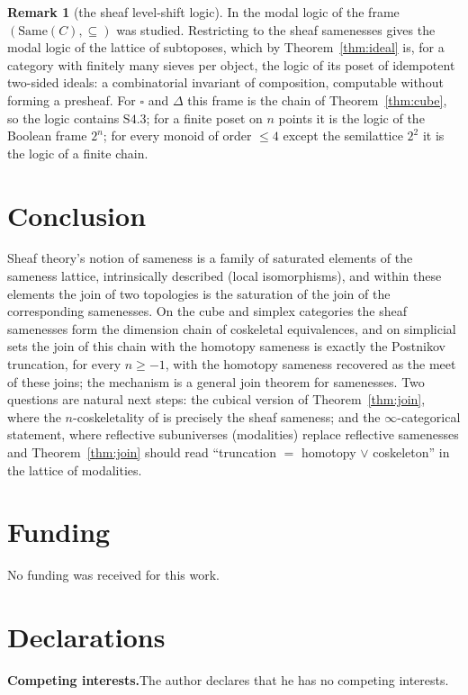 \documentclass[11pt]{amsart}
\theoremstyle{definition}
\newtheorem{rem}[thm]{Remark}
\newcommand{\Same}{\mathrm{Same}}
\newcommand{\cube}{\square}
\begin{document}
\begin{rem}[the sheaf level-shift logic]
In \cite{SameB} the modal logic of the frame $(\Same(C),\subseteq)$ was
studied. Restricting to the sheaf samenesses gives the modal logic of the lattice
of subtoposes, which by Theorem~\ref{thm:ideal} is, for a category with
finitely many sieves per object, the logic of its poset of idempotent
two-sided ideals: a combinatorial invariant of composition, computable without
forming a presheaf. For $\cube$ and $\Delta$ this frame is the chain of
Theorem~\ref{thm:cube}, so the logic contains $\mathrm{S4.3}$; for a finite
poset on $n$ points it is the logic of the Boolean frame $2^n$; for every
monoid of order $\le4$ except the semilattice $2^2$ it is the logic of a
finite chain.
\end{rem}

\section{Conclusion}
Sheaf theory's notion of sameness is a family of saturated elements of the
sameness lattice, intrinsically described (local isomorphisms), and within
these elements the join of two topologies is the saturation of the join of the
corresponding samenesses. On the cube and simplex categories the sheaf samenesses form the
dimension chain of coskeletal equivalences, and on simplicial sets the join
of this chain with the homotopy sameness is exactly the Postnikov truncation,
for every $n\ge-1$, with the homotopy sameness recovered as the meet of these
joins; the mechanism is a general join theorem for samenesses. Two questions are natural next steps:
the cubical version of Theorem~\ref{thm:join}, where the $n$-coskeletality of
\cite{Cubes} is precisely the sheaf sameness; and the $\infty$-categorical
statement, where reflective subuniverses (modalities) replace reflective
samenesses and Theorem~\ref{thm:join} should read ``truncation $=$ homotopy
$\vee$ coskeleton'' in the lattice of modalities.

\section*{Funding}
No funding was received for this work.

\section*{Declarations}
\noindent\textbf{Competing interests.}\quad The author declares that he has no
competing interests.
\end{document}
